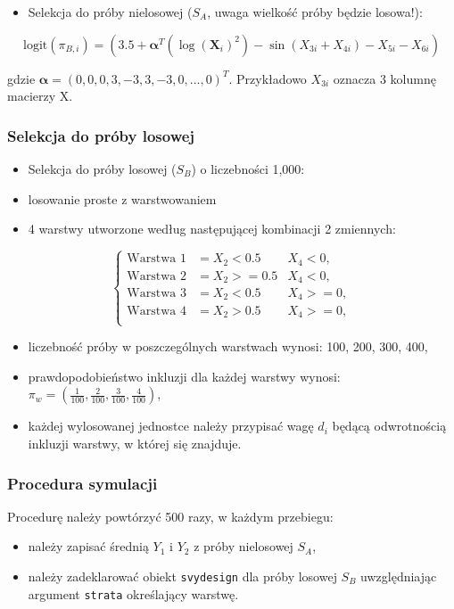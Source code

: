 \documentclass[
]{article}
\providecommand{\tightlist}{%
  \setlength{\itemsep}{0pt}\setlength{\parskip}{0pt}}
\begin{document}
\begin{itemize}
\tightlist
\item
  Selekcja do próby nielosowej (\(S_A\), uwaga wielkość próby będzie
  losowa!):
\end{itemize}

\[
\text{logit}(\pi_{B,i}) = (3.5 + \mathbf{\alpha}^T(\log(\mathbf{X}_i)^2) - \sin(X_{3i} + X_{4i}) - X_{5i} - X_{6i})
\]

gdzie \(\mathbf{\alpha}=(0,0,0,3,-3,3,-3,0,...,0)^T\). Przykładowo
\(X_{3i}\) oznacza 3 kolumnę macierzy X.

\subsubsection{Selekcja do próby
losowej}\label{selekcja-do-pruxf3by-losowej}

\begin{itemize}
\tightlist
\item
  Selekcja do próby losowej (\(S_B\)) o liczebności 1,000:
\item
  losowanie proste z warstwowaniem
\item
  4 warstwy utworzone według następującej kombinacji 2 zmiennych:
\end{itemize}

\[
\begin{cases}
\text{Warstwa 1} & = X_2 < 0.5 & X_4 < 0,\\
\text{Warstwa 2} & = X_2 >= 0.5 & X_4 < 0,\\
\text{Warstwa 3} & = X_2 < 0.5 & X_4 >= 0,\\
\text{Warstwa 4} & = X_2 > 0.5 & X_4 >= 0,\\
\end{cases}
\]

\begin{itemize}
\item
  liczebność próby w poszczególnych warstwach wynosi: 100, 200, 300,
  400,
\item
  prawdopodobieństwo inkluzji dla każdej warstwy wynosi:
  \(\pi_w=(\frac{1}{100}, \frac{2}{100}, \frac{3}{100}, \frac{4}{100})\),
\item
  każdej wylosowanej jednostce należy przypisać wagę \(d_i\) będącą
  odwrotnością inkluzji warstwy, w której się znajduje.
\end{itemize}

\subsubsection{Procedura symulacji}\label{procedura-symulacji}

Procedurę należy powtórzyć 500 razy, w każdym przebiegu:

\begin{itemize}
\tightlist
\item
  należy zapisać średnią \(Y_1\) i \(Y_2\) z próby nielosowej \(S_A\),
\item
  należy zadeklarować obiekt \texttt{svydesign} dla próby losowej
  \(S_B\) uwzględniając argument \texttt{strata} określający warstwę.
\end{itemize}
\end{document}
